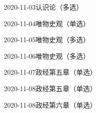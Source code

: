 \documentclass{ctexart}
\begin{document}
\begin{sdpolitics}{2020-11-03}{认识论（多选）}
\end{sdpolitics}

\begin{sdpolitics}{2020-11-04}{唯物史观（单选）}
\end{sdpolitics}

\begin{sdpolitics}{2020-11-05}{唯物史观（多选）}
\end{sdpolitics}

\begin{sdpolitics}{2020-11-06}{唯物史观（多选）}
\end{sdpolitics}

\begin{sdpolitics}{2020-11-07}{政经第五章（单选）}
\end{sdpolitics}

\begin{sdpolitics}{2020-11-08}{政经第五章（单选）}
\end{sdpolitics}

\begin{sdpolitics}{2020-11-08}{政经第六章（单选）}
\end{sdpolitics}
\end{document}

